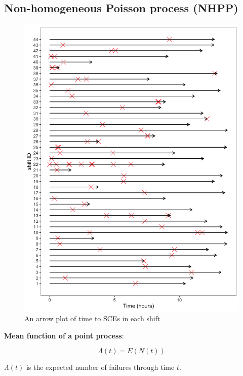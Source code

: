 \documentclass[12pt]{book}
\numberwithin{equation}{chapter}
\begin{document}
\hypertarget{non-homogeneous-poisson-process-nhpp}{%
\subsection{Non-homogeneous Poisson process (NHPP)}\label{non-homogeneous-poisson-process-nhpp}}

\begin{figure}

{\centering \includegraphics[width=\linewidth]{figs/NHPP_arrow_plot} 

}

\caption{An arrow plot of time to SCEs in each shift}\label{fig:arrowplot}
\end{figure}

\textbf{Mean function of a point process}:

\[\Lambda(t) = E(N(t))\]

\(\Lambda(t)\) is the expected number of failures through time \(t\).
\end{document}
